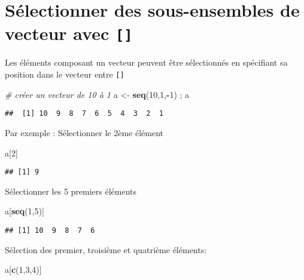\documentclass[]{book}
\newenvironment{Shaded}{\begin{snugshade}}{\end{snugshade}}
\newcommand{\CommentTok}[1]{\textcolor[rgb]{0.56,0.35,0.01}{\textit{#1}}}
\newcommand{\DecValTok}[1]{\textcolor[rgb]{0.00,0.00,0.81}{#1}}
\newcommand{\KeywordTok}[1]{\textcolor[rgb]{0.13,0.29,0.53}{\textbf{#1}}}
\newcommand{\NormalTok}[1]{#1}
\newcommand{\OperatorTok}[1]{\textcolor[rgb]{0.81,0.36,0.00}{\textbf{#1}}}
\newcommand{\StringTok}[1]{\textcolor[rgb]{0.31,0.60,0.02}{#1}}
\begin{document}
\hypertarget{selectionner-des-sous-ensembles-de-vecteur-avec-1}{%
\section{\texorpdfstring{Sélectionner des sous-ensembles de vecteur avec \texttt{{[}{]}}}{Sélectionner des sous-ensembles de vecteur avec {[}{]}}}\label{selectionner-des-sous-ensembles-de-vecteur-avec-1}}

Les éléments composant un vecteur peuvent être sélectionnés en spécifiant sa position dans le vecteur entre \texttt{{[}{]}}

\begin{Shaded}
\begin{Highlighting}[]
\CommentTok{# créer un vecteur de 10 à 1}
\NormalTok{a <-}\StringTok{ }\KeywordTok{seq}\NormalTok{(}\DecValTok{10}\NormalTok{,}\DecValTok{1}\NormalTok{,}\OperatorTok{-}\DecValTok{1}\NormalTok{) ; a}
\end{Highlighting}
\end{Shaded}

\begin{verbatim}
##  [1] 10  9  8  7  6  5  4  3  2  1
\end{verbatim}

Par exemple : Sélectionner le 2ème élément

\begin{Shaded}
\begin{Highlighting}[]
\NormalTok{a[}\DecValTok{2}\NormalTok{]}
\end{Highlighting}
\end{Shaded}

\begin{verbatim}
## [1] 9
\end{verbatim}

Sélectionner les 5 premiers éléments

\begin{Shaded}
\begin{Highlighting}[]
\NormalTok{a[}\KeywordTok{seq}\NormalTok{(}\DecValTok{1}\NormalTok{,}\DecValTok{5}\NormalTok{)]}
\end{Highlighting}
\end{Shaded}

\begin{verbatim}
## [1] 10  9  8  7  6
\end{verbatim}

Sélection des premier, troisième et quatrième éléments:

\begin{Shaded}
\begin{Highlighting}[]
\NormalTok{a[}\KeywordTok{c}\NormalTok{(}\DecValTok{1}\NormalTok{,}\DecValTok{3}\NormalTok{,}\DecValTok{4}\NormalTok{)]}
\end{Highlighting}
\end{Shaded}
\end{document}
